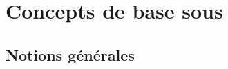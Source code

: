 %
%
\setcounter{remarque-cnt}{1}
\setcounter{example-cnt}{1}
\chapter{Concepts de base sous {\Unix}}
\thispagestyle{fancy}

\section{Notions g{\'e}n{\'e}rales}

